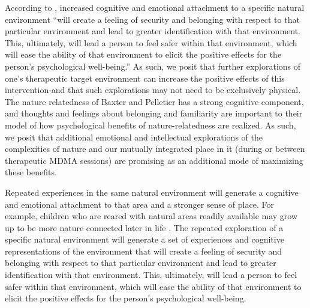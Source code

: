 \documentclass[12pt,letterpaper]{book}
\begin{document}
According to \textcite{baxterNatureRelatedness}, increased cognitive and emotional attachment to a specific natural environment “will create a feeling of security and belonging with respect to that particular environment and lead to greater identification with that environment. This, ultimately, will lead a person to feel safer within that environment, which will ease the ability of that environment to elicit the positive effects for the person's psychological well-being.” As such, we posit that further explorations of one's therapeutic target environment can increase the positive effects of this intervention-and that such explorations may not need to be exclusively physical. The nature relatedness of Baxter and Pelletier has a strong cognitive component, and thoughts and feelings about belonging and familiarity are important to their model of how psychological benefits of nature-relatedness are realized. As such, we posit that additional emotional and intellectual explorations of the complexities of nature and our mutually integrated place in it (during or between therapeutic MDMA sessions) are promising as an additional mode of maximizing these benefits.

Repeated experiences in the same natural environment will generate a cognitive and emotional attachment to that area and a stronger sense of place. For example, children who are reared with natural areas readily available may grow up to be more nature connected later in life \cite{windhorst2015growing}. The repeated exploration of a specific natural environment will generate a set of experiences and cognitive representations of the environment that will create a feeling of security and belonging with respect to that particular environment and lead to greater identification with that environment. This, ultimately, will lead a person to feel safer within that environment, which will ease the ability of that environment to elicit the positive effects for the person's psychological well-being.

\end{document}
